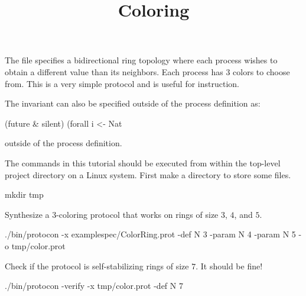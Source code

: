 
\title{Coloring}
\date{}



The  file specifies a bidirectional ring topology where each process wishes to obtain a different value than its neighbors.
Each process has $3$ colors to choose from.
This is a very simple protocol and is useful for instruction.

The invariant can also be specified outside of the process definition as:
\begin{code}
(future & silent)
  (forall i <- Nat %
\end{code}
outside of the process definition.

The commands in this tutorial should be executed from within the top-level project directory on a Linux system.
First make a directory  to store some files.
\begin{code}
mkdir tmp
\end{code}

Synthesize a 3-coloring protocol that works on rings of size $3$, $4$, and $5$.
\begin{code}
./bin/protocon -x examplespec/ColorRing.prot -def N 3 -param N 4 -param N 5 -o tmp/color.prot
\end{code}

Check if the protocol is self-stabilizing rings of size $7$. It should be fine!
\begin{code}
./bin/protocon -verify -x tmp/color.prot -def N 7
\end{code}

